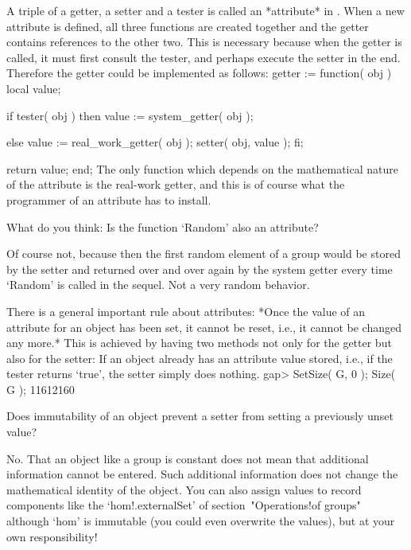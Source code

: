 A triple of a getter,  a setter and a tester  is called an *attribute* in
{\GAP}. When a new attribute is  defined, all three functions are created
together  and the getter contains  references to  the  other two. This is
necessary because when the  getter is called,  it must first consult  the
tester,  and perhaps execute the setter  in the end. Therefore the getter
could be implemented as follows:
\begintt
    getter := function( obj )
    local   value;

        if tester( obj )  then
            value := system_getter( obj );

        else
            value := real_work_getter( obj );
            setter( obj, value );
        fi;

        return value;
    end;
\endtt
The  only  function which depends  on  the   mathematical  nature of  the
attribute  is  the real-work  getter, and  this  is of   course  what the
programmer of an attribute has to install.

\exercise  What  do you think:  Is  the {\GAP} function  `Random' also an
attribute?

\answer Of course  not, because then the  first random element of a group
would be stored by  the setter and returned over  and  over again by  the
system getter every  time `Random' is  called in  the sequel.  Not a very
random behavior.

There is a general important rule about attributes: *Once the value of an
attribute for an object has been set, it cannot be reset, i.e., it cannot
be changed any more.* This is achieved by having two methods not only for
the getter but also for the setter: If an object already has an attribute
value stored, i.e., if the tester returns `true',  the setter simply does
nothing.
\beginexample
    gap> SetSize( G, 0 ); Size( G );
    11612160
\endexample

\exercise Does immutability of an object prevent a  setter from setting a
previously unset value?

\answer No. That  an object like a group  is constant does not mean  that
additional  information  cannot  be  entered. Such additional information
does not  change the mathematical  identity of  the object.  You can also
assign values to   record   components like  the `hom!.externalSet'    of
section~"Operations!of  groups" although `hom'  is  immutable  (you could
even overwrite the values), but at your own responsibility!

\null

